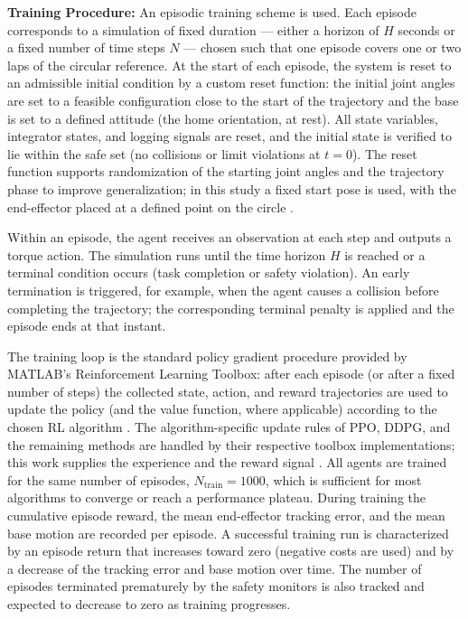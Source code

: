 \documentclass{ieeeaccess}
\begin{document}
\textbf{Training Procedure:} An episodic training scheme is used. Each episode corresponds to a
simulation of fixed duration --- either a horizon of $H$ seconds or a fixed number of time steps $N$ --- chosen such that
one episode covers one or two laps of the circular reference. At the start of each episode, the system is reset to an admissible initial condition by a
custom reset function: the initial joint angles are set to a feasible configuration close to the start of the trajectory and the base is set to a defined attitude (the home orientation, at rest). All state variables, integrator states, and logging signals are reset, and the initial state is verified to lie within the safe set (no collisions or limit violations at $t = 0$). The reset function supports randomization of the starting joint angles and the trajectory phase to improve generalization; in this study a fixed start pose is used, with the end-effector placed at a defined point on the circle \cite{b7}.

Within an episode, the agent receives an observation at each step and outputs a torque action. The
simulation runs until the time horizon $H$ is reached or a terminal condition occurs (task completion or safety violation). An early termination is triggered, for example, when the agent causes a collision before completing the trajectory; the corresponding terminal penalty is applied and the episode ends at that instant.

The training loop is the standard policy gradient procedure provided by MATLAB's Reinforcement Learning Toolbox: after each episode (or after a fixed number of steps) the collected state, action, and reward trajectories are used to
update the policy (and the value function, where applicable) according to the chosen RL algorithm \cite{b4}. The algorithm-specific update rules of PPO, DDPG, and the remaining methods are handled by their respective toolbox implementations; this work supplies the experience and the reward signal \cite{b7}.
All agents are trained for the same number of episodes, $N_{\mathrm{train}} = 1000$, which is sufficient for most algorithms to
converge or reach a performance plateau. During training the cumulative episode reward, the mean end-effector tracking error, and the mean base motion are recorded per episode. A successful training run is characterized by an episode return that increases toward zero (negative costs are used) and by a decrease of the tracking error and base motion over time. The number of episodes terminated prematurely by the safety monitors is also tracked and expected to decrease to zero as training progresses.
\end{document}
